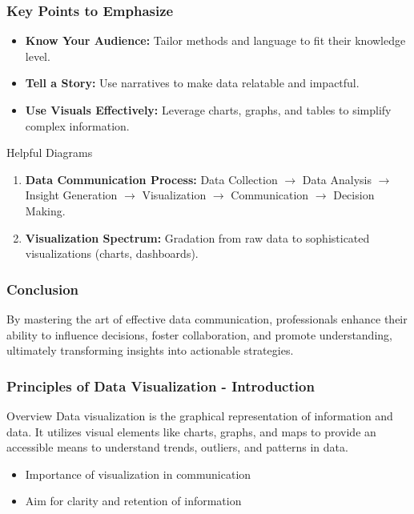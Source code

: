 \documentclass{beamer}
\begin{document}
\begin{frame}[fragile]
    \frametitle{Key Points to Emphasize}

    \begin{itemize}
        \item \textbf{Know Your Audience:} Tailor methods and language to fit their knowledge level.
        \item \textbf{Tell a Story:} Use narratives to make data relatable and impactful.
        \item \textbf{Use Visuals Effectively:} Leverage charts, graphs, and tables to simplify complex information.
    \end{itemize}
    
    \begin{block}{Helpful Diagrams}
        \begin{enumerate}
            \item \textbf{Data Communication Process:} Data Collection $\rightarrow$ Data Analysis $\rightarrow$ Insight Generation $\rightarrow$ Visualization $\rightarrow$ Communication $\rightarrow$ Decision Making.
            \item \textbf{Visualization Spectrum:} Gradation from raw data to sophisticated visualizations (charts, dashboards).
        \end{enumerate}
    \end{block}
\end{frame}

\begin{frame}[fragile]
    \frametitle{Conclusion}

    By mastering the art of effective data communication, professionals enhance their ability to influence decisions, foster collaboration, and promote understanding, ultimately transforming insights into actionable strategies.
\end{frame}

\begin{frame}[fragile]
    \frametitle{Principles of Data Visualization - Introduction}
    \begin{block}{Overview}
        Data visualization is the graphical representation of information and data. It utilizes visual elements like charts, graphs, and maps to provide an accessible means to understand trends, outliers, and patterns in data.
    \end{block}
    \begin{itemize}
        \item Importance of visualization in communication
        \item Aim for clarity and retention of information
    \end{itemize}
\end{frame}
\end{document}

